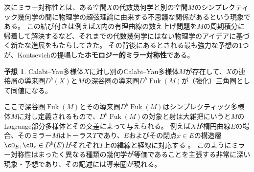 \documentclass[a4j,uplatex,dvipdfmx]{jsarticle}
\numberwithin{equation}{section}
\numberwithin{figure}{section}
\theoremstyle{definition}
\newtheorem{conjecture}[theorem]{予想}
\DeclareMathOperator{\Fuk}{Fuk}
\begin{document}
次にミラー対称性とは、ある空間$X$の代数幾何学と別の空間$M$のシンプレクティック幾何学の間に物理学の超弦理論に由来する不思議な関係があるという現象である。
この結び付きは例えば$X$内の有理曲線の数え上げ問題を$M$の周期積分に帰着して解決するなど、それまでの代数幾何学にはない物理学のアイデアに基づく新たな進展をもたらしてきた。
その背後にあるとされる最も強力な予想の1つが、Kontsevichの提唱した\textbf{ホモロジー的ミラー対称性}である。
\begin{conjecture}
    Calabi--Yau多様体$X$に対し別のCalabi--Yau多様体$M$が存在して、$X$の連接層の導来圏$D^b (X)$と$M$の深谷圏の導来圏$D^b \Fuk(M)$が（強化）三角圏として同値になる。
\end{conjecture}
ここで深谷圏$\Fuk(M)$とその導来圏$D^b \Fuk(M)$はシンプレクティック多様体$M$に対し定義されるもので、$D^b \Fuk(M)$の対象と射は大雑把にいうと$M$のLagrange部分多様体とその交差によって与えられる。
例えば$X$が楕円曲線$E$の場合、そのミラー$M$はトーラス$T$であり、$E$およびその閉点$x \in E$の構造層$\cO_E, \cO_x \in D^b(E)$がそれぞれ$T$上の緯線と経線に対応する \cite{MR1633036}。
このようにミラー対称性はまったく異なる種類の幾何学が等価であることを主張する非常に深い現象・予想であり、その記述には導来圏が現れる。
\end{document}
